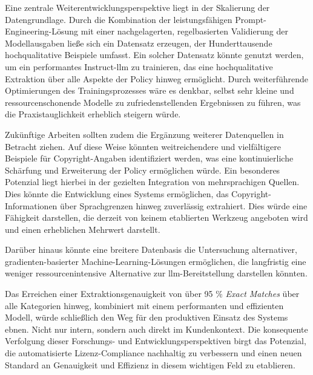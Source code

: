 Eine zentrale Weiterentwicklungsperspektive liegt in der Skalierung der Datengrundlage.
Durch die Kombination der leistungsfähigen Prompt-Engineering-Lösung mit einer nachgelagerten, regelbasierten Validierung der Modellausgaben ließe sich ein Datensatz erzeugen, der Hunderttausende hochqualitative Beispiele umfasst.
Ein solcher Datensatz könnte genutzt werden, um ein performantes Instruct-\gls{llm} zu trainieren, das eine hochqualitative Extraktion über alle Aspekte der Policy hinweg ermöglicht.
Durch weiterführende Optimierungen des Trainingsprozesses wäre es denkbar, selbst sehr kleine und ressourcenschonende Modelle zu zufriedenstellenden Ergebnissen zu führen, was die Praxistauglichkeit erheblich steigern würde.

Zukünftige Arbeiten sollten zudem die Ergänzung weiterer Datenquellen in Betracht ziehen.
Auf diese Weise könnten weitreichendere und vielfältigere Beispiele für Copyright-Angaben identifiziert werden, was eine kontinuierliche Schärfung und Erweiterung der Policy ermöglichen würde.
Ein besonderes Potenzial liegt hierbei in der gezielten Integration von mehrsprachigen Quellen.
Dies könnte die Entwicklung eines Systems ermöglichen, das Copyright-Informationen über Sprachgrenzen hinweg zuverlässig extrahiert.
Dies würde eine Fähigkeit darstellen, die derzeit von keinem etablierten Werkzeug angeboten wird und einen erheblichen Mehrwert darstellt.

Darüber hinaus könnte eine breitere Datenbasis die Untersuchung alternativer, gradienten-basierter Machine-Learning-Lösungen ermöglichen, die langfristig eine weniger ressourcenintensive Alternative zur \gls{llm}-Bereitstellung darstellen könnten.

Das Erreichen einer Extraktionsgenauigkeit von über \num{95} \% \textit{Exact Matches} über alle Kategorien hinweg, kombiniert mit einem performanten und effizienten Modell, würde schließlich den Weg für den produktiven Einsatz des Systems ebnen.
Nicht nur intern, sondern auch direkt im Kundenkontext.
Die konsequente Verfolgung dieser Forschungs- und Entwicklungsperspektiven birgt das Potenzial, die automatisierte Lizenz-Compliance nachhaltig zu verbessern und einen neuen Standard an Genauigkeit und Effizienz in diesem wichtigen Feld zu etablieren.
